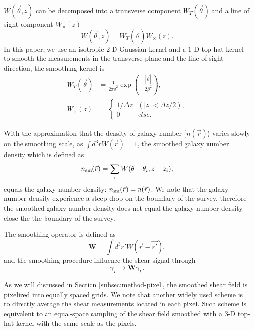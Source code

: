 \documentclass[twocolumn]{aastex62}
\begin{document}
$W(\vec{\theta},z)$ can be decomposed into a transverse component $W_T(\vec{\theta})$ and a line of sight component
$W_\times(z)$
\begin{equation}
W(\vec{\theta},z)=W_T(\vec{\theta}) W_\times (z).
\end{equation}
In this paper, we use an isotropic $2$-D Gaussian kernel and a $1$-D top-hat kernel to smooth the measurements in the
transverse plane and the line of sight direction, the smoothing kernel is
\begin{equation}
\begin{split}
W_T(\vec{\theta}) &=\frac{1}{2\pi\beta^2}\exp(-\frac{|\vec{\theta}|}{2\beta^2}),\\
W_\times (z) &=
\begin{cases}
1/\Delta z& (|z|<\Delta z/2),\\
0& else.
\end{cases}
\end{split}
\end{equation}

With the approximation that the density of galaxy number ($n(\vec{r})$) varies slowly on the smoothing scale,
as $\int d^3r W(\vec{r})=1$, the smoothed galaxy number density which is defined as
\begin{equation}\label{eq-numDesSmooth}
n_{\rm{sm}}(\vec{r})=\sum_i W(\vec{\theta}-\vec{\theta_i},z-z_i),
\end{equation}
equals the galaxy number density: $n_{\rm{sm}}(\vec{r})=n(\vec{r})$.
We note that the galaxy number density experience a steep drop on the boundary of the survey, therefore the
smoothed galaxy number density does not equal the galaxy number density close the the boundary of the survey.

The smoothing operator is defined as
\begin{equation}
\mathbf{W} = \int d^3 r' W(\vec{r}-\vec{r'}),
\end{equation}
and the smoothing procedure influence the shear signal through
\begin{equation}
\gamma_L \rightarrow \mathbf{W} \gamma_L.
\end{equation}

As we will discussed in Section \ref{subsec:method-pixel}, the smoothed shear field is pixelized into equally spaced
grids. We note that another widely used scheme is to directly average the shear measurements located in each pixel.
Such scheme is equivalent to an equal-space sampling of the shear field smoothed with a $3$-D top-hat kernel with the
same scale as the pixels.
\end{document}
